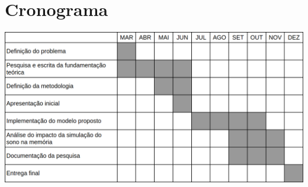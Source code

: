 \section{Cronograma}

\begin{table}[!ht]
\centering\label{fig_cronograma}
\includegraphics[width=\linewidth]{figuras/cronograma.png}
\end{table}